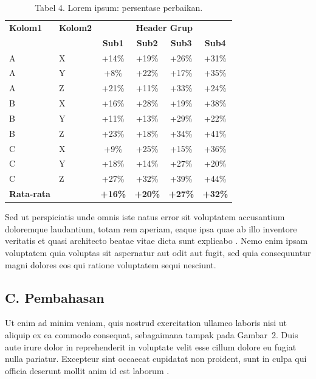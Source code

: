 \begin{table}[h]
  \caption{Tabel 4. Lorem ipsum: persentase perbaikan.}
  \centering
  \begin{tabular}{>{\centering\arraybackslash}p{2.2cm}>{\centering\arraybackslash}p{1.0cm}cccc}
  \hline
  \textbf{Kolom1} & \textbf{Kolom2} & \multicolumn{4}{c}{\textbf{Header Grup}} \\
  & & \textbf{Sub1} & \textbf{Sub2} & \textbf{Sub3} & \textbf{Sub4} \\
  \hline
  A & X & +14\% & +19\% & +26\% & +31\% \\
  A & Y & +8\%  & +22\% & +17\% & +35\% \\
  A & Z & +21\% & +11\% & +33\% & +24\% \\
  B & X & +16\% & +28\% & +19\% & +38\% \\
  B & Y & +11\% & +13\% & +29\% & +22\% \\
  B & Z & +23\% & +18\% & +34\% & +41\% \\
  C & X & +9\%  & +25\% & +15\% & +36\% \\
  C & Y & +18\% & +14\% & +27\% & +20\% \\
  C & Z & +27\% & +32\% & +39\% & +44\% \\
  \hline
  \textbf{Rata-rata} & & \textbf{+16\%} & \textbf{+20\%} & \textbf{+27\%} & \textbf{+32\%} \\
  \hline
  \end{tabular}
\end{table}

Sed ut perspiciatis unde omnis iste natus error sit voluptatem accusantium
doloremque laudantium, totam rem aperiam, eaque ipsa quae ab illo inventore
veritatis et quasi architecto beatae vitae dicta sunt explicabo
\cite{ContohSatu2024,ContohDua2023}. Nemo enim ipsam voluptatem quia voluptas
sit aspernatur aut odit aut fugit, sed quia consequuntur magni dolores eos qui
ratione voluptatem sequi nesciunt.

\subsection{C. Pembahasan}

Ut enim ad minim veniam, quis nostrud exercitation ullamco laboris nisi ut
aliquip ex ea commodo consequat, sebagaimana tampak pada Gambar~2. Duis aute
irure dolor in reprehenderit in voluptate velit esse cillum dolore eu fugiat
nulla pariatur. Excepteur sint occaecat cupidatat non proident, sunt in culpa
qui officia deserunt mollit anim id est laborum \cite{ContohDua2023}.

